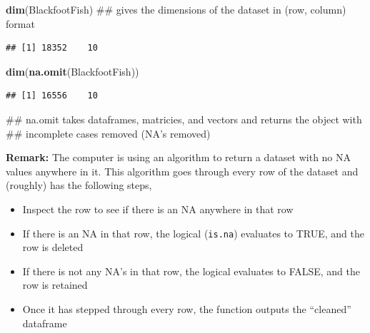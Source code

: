 \documentclass[]{article}
\newenvironment{Shaded}{\begin{snugshade}}{\end{snugshade}}
\newcommand{\KeywordTok}[1]{\textcolor[rgb]{0.13,0.29,0.53}{\textbf{#1}}}
\newcommand{\NormalTok}[1]{#1}
\providecommand{\tightlist}{%
  \setlength{\itemsep}{0pt}\setlength{\parskip}{0pt}}
\begin{document}
\begin{Shaded}
\begin{Highlighting}[]
\KeywordTok{dim}\NormalTok{(BlackfootFish)  ## gives the dimensions of the dataset in (row, column) format  }
\end{Highlighting}
\end{Shaded}

\begin{verbatim}
## [1] 18352    10
\end{verbatim}

\begin{Shaded}
\begin{Highlighting}[]
\KeywordTok{dim}\NormalTok{(}\KeywordTok{na.omit}\NormalTok{(BlackfootFish))}
\end{Highlighting}
\end{Shaded}

\begin{verbatim}
## [1] 16556    10
\end{verbatim}

\begin{Shaded}
\begin{Highlighting}[]
\NormalTok{## na.omit takes dataframes, matricies, and vectors and returns the object with}
\NormalTok{## incomplete cases removed (NA's removed)}
\end{Highlighting}
\end{Shaded}

\vspace{0.5cm}

\textbf{Remark:} The computer is using an algorithm to return a dataset
with no NA values anywhere in it. This algorithm goes through every row
of the dataset and (roughly) has the following steps,

\begin{itemize}
\tightlist
\item
  Inspect the row to see if there is an NA anywhere in that row\\
\item
  If there is an NA in that row, the logical (\texttt{is.na}) evaluates
  to TRUE, and the row is deleted\\
\item
  If there is not any NA's in that row, the logical evaluates to FALSE,
  and the row is retained\\
\item
  Once it has stepped through every row, the function outputs the
  ``cleaned'' dataframe
\end{itemize}
\end{document}
